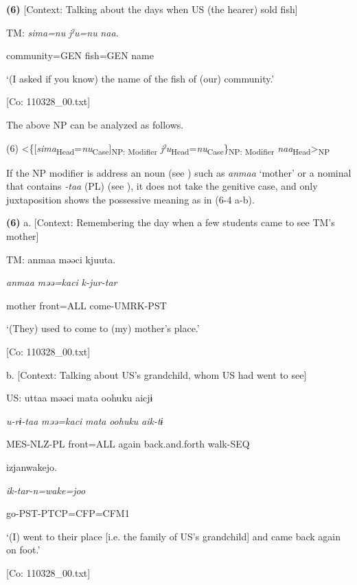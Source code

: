 \textbf{(6)}    [Context: Talking about the days when US (the hearer) sold fish]

  TM:  \textit{sima=nu}  \textit{jˀu=nu}  \textit{naa.}

    community=GEN  fish=GEN  name

    ‘(I asked if you know) the name of the fish of (our) community.’

    [Co: 110328\_00.txt]

The above NP can be analyzed as follows.

(6)    <\{[\textit{sima}\textsubscript{Head}=\textit{nu}\textsubscript{Case}]\textsubscript{NP: Modifier} \textit{jˀu}\textsubscript{Head}=\textit{nu}\textsubscript{Case}\}\textsubscript{NP: Modifier} \textit{naa}\textsubscript{Head}>\textsubscript{NP}

If the NP modifier is address an noun (see ) such as \textit{anmaa} ‘mother’ or a nominal that contains \textit{{}-taa} (PL) (see ), it does not take the genitive case, and only juxtaposition shows the possessive meaning as in (6-4 a-b).

\textbf{(6)}  a.  [Context: Remembering the day when a few students came to see TM’s mother]

    TM:  anmaa  məəci  kjuuta.

      \textit{anmaa}  \textit{məə=kaci}  \textit{k-jur-tar}

      mother  front=ALL  come-UMRK-PST

      ‘(They) used to come to (my) mother’s place.’

      [Co: 110328\_00.txt]

  b.  [Context: Talking about US’s grandchild, whom US had went to see]

    US:  uttaa  məəci  mata  {\textbar}oohuku{\textbar}  aicjɨ

      \textit{u-rɨ-taa}  \textit{məə=kaci}  \textit{mata}  \textit{oohuku}  \textit{aik-tɨ}

      MES-NLZ-PL  front=ALL  again  back.and.forth  walk-SEQ

      izjanwakejo.

      \textit{ik-tar-n=wake=joo}

      go-PST-PTCP=CFP=CFM1

      ‘(I) went to their place [i.e. the family of US’s grandchild] and came back again on foot.’

      [Co: 110328\_00.txt]

